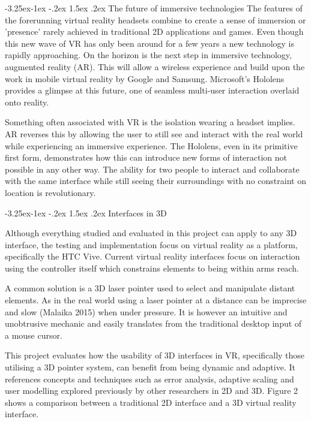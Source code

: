\documentclass[12pt]{article}
\makeatletter
\renewcommand{\subsection}{\@startsection{subsection}{2}{\z@}%
             {-3.25ex\@plus -1ex \@minus -.2ex}%
             {1.5ex \@plus .2ex}%
             {\normalfont\large\scshape\bfseries}}
\makeatother
\begin{document}
\subsection{The future of immersive technologies}
The features of the forerunning virtual reality headsets combine to create a sense of immersion or 'presence' rarely achieved in traditional 2D applications and games. Even though this new wave of VR has only been around for a few years a new technology is rapidly approaching. On the horizon is the next step in immersive technology, augmented reality (AR). This will allow a wireless experience and build upon the work in mobile virtual reality by Google and Samsung. Microsoft's Hololens provides a glimpse at this future, one of seamless multi-user interaction overlaid onto reality. 

Something often associated with VR is the isolation wearing a headset implies. AR reverses this by allowing the user to still see and interact with the real world while experiencing an immersive experience. The Hololens, even in its primitive first form, demonstrates how this can introduce new forms of interaction not possible in any other way. The ability for two people to interact and collaborate with the same interface while still seeing their surroundings with no constraint on location is revolutionary.

\subsection{Interfaces in 3D}

Although everything studied and evaluated in this project can apply to any 3D interface, the testing and implementation focus on virtual reality as a platform, specifically the HTC Vive. Current virtual reality interfaces focus on interaction using the controller itself which constrains elements to being within arms reach.

A common solution is a 3D laser pointer used to select and manipulate distant elements. As in the real world using a laser pointer at a distance can be imprecise and slow (Malaika 2015) when under pressure. It is however an intuitive and unobtrusive mechanic and easily translates from the traditional desktop input of a mouse cursor.

This project evaluates how the usability of 3D interfaces in VR, specifically those utilising a 3D pointer system, can benefit from being dynamic and adaptive. It references concepts and techniques such as error analysis, adaptive scaling and user modelling explored previously by other researchers in 2D and 3D. Figure 2 shows a comparison between a traditional 2D interface and a 3D virtual reality interface.
\end{document}
